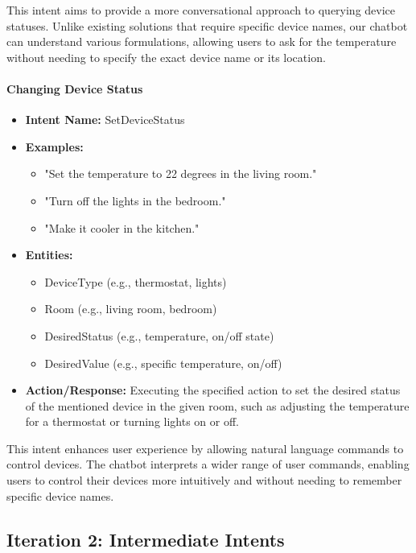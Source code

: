This intent aims to provide a more conversational approach to querying device statuses. Unlike existing solutions that require specific device names, our chatbot can understand various formulations, allowing users to ask for the temperature without needing to specify the exact device name or its location.

\paragraph{Changing Device Status}

\begin{itemize}
    \item \textbf{Intent Name:} SetDeviceStatus
    \item \textbf{Examples:}
    \begin{itemize}
        \item "Set the temperature to 22 degrees in the living room."
        \item "Turn off the lights in the bedroom."
        \item "Make it cooler in the kitchen."
    \end{itemize}
    \item \textbf{Entities:}
    \begin{itemize}
        \item DeviceType (e.g., thermostat, lights)
        \item Room (e.g., living room, bedroom)
        \item DesiredStatus (e.g., temperature, on/off state)
        \item DesiredValue (e.g., specific temperature, on/off)
    \end{itemize}
    \item \textbf{Action/Response:} Executing the specified action to set the desired status of the mentioned device in the given room, such as adjusting the temperature for a thermostat or turning lights on or off.
\end{itemize}

This intent enhances user experience by allowing natural language commands to control devices. The chatbot interprets a wider range of user commands, enabling users to control their devices more intuitively and without needing to remember specific device names.

\subsection{Iteration 2: Intermediate Intents}

